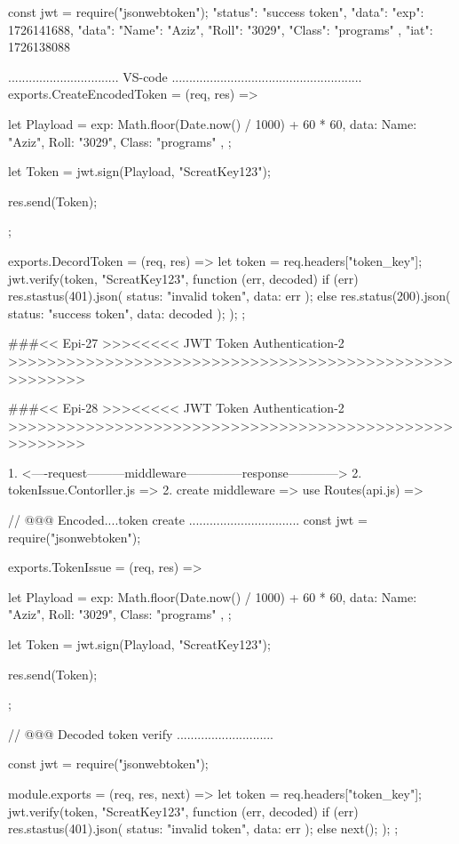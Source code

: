 const jwt = require("jsonwebtoken");
"status": "success token",
    "data": {
        "exp": 1726141688,
        "data": {
            "Name": "Aziz",
            "Roll": "3029",
            "Class": "programs"
        },
        "iat": 1726138088
    }

................................ VS-code .......................................................
exports.CreateEncodedToken = (req, res) => {
  let Playload = {
    exp: Math.floor(Date.now() / 1000) + 60 * 60,
    data: { Name: "Aziz", Roll: "3029", Class: "programs" },
  };

  let Token = jwt.sign(Playload, "ScreatKey123");

  res.send(Token);
};

exports.DecordToken = (req, res) => {
  let token = req.headers["token_key"];
  jwt.verify(token, "ScreatKey123", function (err, decoded) {
    if (err) {
      res.stastus(401).json({ status: "invalid token", data: err });
    } else {
      res.status(200).json({ status: "success token", data: decoded });
    }
  });
};

###<< Epi-27 >>><<<<< JWT Token Authentication-2 >>>>>>>>>>>>>>>>>>>>>>>>>>>>>>>>>>>>>>>>>>>>>>>>>>>>>>

###<< Epi-28 >>><<<<< JWT Token Authentication-2 >>>>>>>>>>>>>>>>>>>>>>>>>>>>>>>>>>>>>>>>>>>>>>>>>>>>>>

1. <----request---------middleware--------------response------------>
2. tokenIssue.Contorller.js => 
2. create  middleware => use Routes(api.js) => 

// @@@ Encoded....token create ................................
const jwt = require("jsonwebtoken");

exports.TokenIssue = (req, res) => {
  let Playload = {
    exp: Math.floor(Date.now() / 1000) + 60 * 60,
    data: { Name: "Aziz", Roll: "3029", Class: "programs" },
  };

  let Token = jwt.sign(Playload, "ScreatKey123");

  res.send(Token);
};

// @@@ Decoded token verify ............................

const jwt = require("jsonwebtoken");

module.exports = (req, res, next) => {
  let token = req.headers["token_key"];
  jwt.verify(token, "ScreatKey123", function (err, decoded) {
    if (err) {
      res.stastus(401).json({ status: "invalid token", data: err });
    } else {
      next();
    }
  });
};

